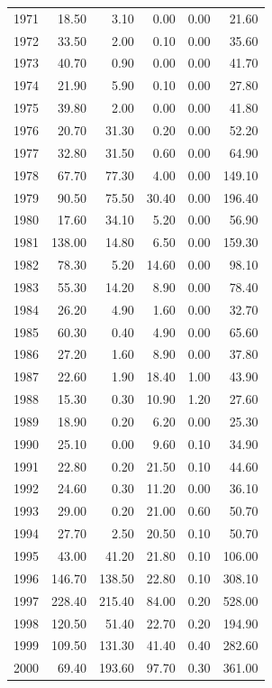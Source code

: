 \documentclass[12pt,]{article}
\begin{document}
\begin{longtable}{rrrrrr}
  1971 & 18.50 & 3.10 & 0.00 & 0.00 & 21.60 \\ 
  1972 & 33.50 & 2.00 & 0.10 & 0.00 & 35.60 \\ 
  1973 & 40.70 & 0.90 & 0.00 & 0.00 & 41.70 \\ 
  1974 & 21.90 & 5.90 & 0.10 & 0.00 & 27.80 \\ 
  1975 & 39.80 & 2.00 & 0.00 & 0.00 & 41.80 \\ 
  1976 & 20.70 & 31.30 & 0.20 & 0.00 & 52.20 \\ 
  1977 & 32.80 & 31.50 & 0.60 & 0.00 & 64.90 \\ 
  1978 & 67.70 & 77.30 & 4.00 & 0.00 & 149.10 \\ 
  1979 & 90.50 & 75.50 & 30.40 & 0.00 & 196.40 \\ 
  1980 & 17.60 & 34.10 & 5.20 & 0.00 & 56.90 \\ 
  1981 & 138.00 & 14.80 & 6.50 & 0.00 & 159.30 \\ 
  1982 & 78.30 & 5.20 & 14.60 & 0.00 & 98.10 \\ 
  1983 & 55.30 & 14.20 & 8.90 & 0.00 & 78.40 \\ 
  1984 & 26.20 & 4.90 & 1.60 & 0.00 & 32.70 \\ 
  1985 & 60.30 & 0.40 & 4.90 & 0.00 & 65.60 \\ 
  1986 & 27.20 & 1.60 & 8.90 & 0.00 & 37.80 \\ 
  1987 & 22.60 & 1.90 & 18.40 & 1.00 & 43.90 \\ 
  1988 & 15.30 & 0.30 & 10.90 & 1.20 & 27.60 \\ 
  1989 & 18.90 & 0.20 & 6.20 & 0.00 & 25.30 \\ 
  1990 & 25.10 & 0.00 & 9.60 & 0.10 & 34.90 \\ 
  1991 & 22.80 & 0.20 & 21.50 & 0.10 & 44.60 \\ 
  1992 & 24.60 & 0.30 & 11.20 & 0.00 & 36.10 \\ 
  1993 & 29.00 & 0.20 & 21.00 & 0.60 & 50.70 \\ 
  1994 & 27.70 & 2.50 & 20.50 & 0.10 & 50.70 \\ 
  1995 & 43.00 & 41.20 & 21.80 & 0.10 & 106.00 \\ 
  1996 & 146.70 & 138.50 & 22.80 & 0.10 & 308.10 \\ 
  1997 & 228.40 & 215.40 & 84.00 & 0.20 & 528.00 \\ 
  1998 & 120.50 & 51.40 & 22.70 & 0.20 & 194.90 \\ 
  1999 & 109.50 & 131.30 & 41.40 & 0.40 & 282.60 \\ 
  2000 & 69.40 & 193.60 & 97.70 & 0.30 & 361.00 \\ 

\end{longtable}
\end{document}
